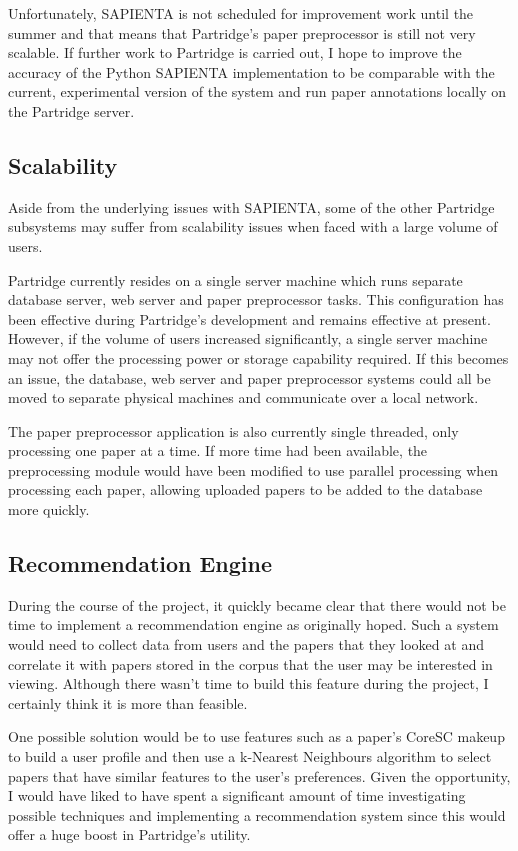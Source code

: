 Unfortunately, SAPIENTA is not scheduled for improvement work until the summer
and that means that Partridge's paper preprocessor is still not very
scalable. If further work to Partridge is carried out, I hope to improve the
accuracy of the Python SAPIENTA implementation to be comparable with the
current, experimental version of the system and run paper annotations locally
on the Partridge server.

\subsection{ Scalability }

Aside from the underlying issues with SAPIENTA, some of the other Partridge
subsystems may suffer from scalability issues when faced with a large volume of
users. 

Partridge currently resides on a single server machine which runs separate
database server, web server and paper preprocessor tasks. This configuration
has been effective during Partridge's development and remains effective at
present. However, if the volume of users increased significantly, a single
server machine may not offer the processing power or storage capability
required. If this becomes an issue, the database, web server and paper
preprocessor systems could all be moved to separate physical machines and
communicate over a local network.

The paper preprocessor application is also currently single threaded, only
processing one paper at a time. If more time had been available, the
preprocessing module would have been modified to use parallel processing when
processing each paper, allowing uploaded papers to be added to the database more
quickly.

\subsection{ Recommendation Engine}

During the course of the project, it quickly became clear that there would
not be time to implement a recommendation engine as originally hoped. Such a
system would need to collect data from users and the papers that they looked at
and correlate it with papers stored in the corpus that the user may be
interested in viewing. Although there wasn't time to build this feature during
the project, I certainly think it is more than feasible. 

One possible solution would be to use features such as a paper's CoreSC makeup
to build a user profile and then use a k-Nearest Neighbours algorithm to select
papers that have similar features to the user's preferences. Given the
opportunity, I would have liked to have spent a significant amount of time
investigating possible techniques and implementing a recommendation system
since this would offer a huge boost in Partridge's utility.

